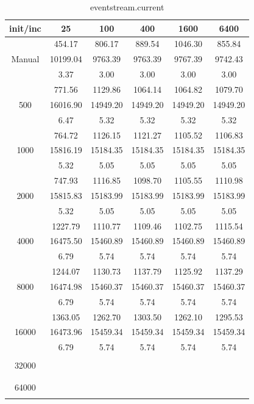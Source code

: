 {\begin{table}[th]
\centering
\begin{tabular}{|c||c|c|c|c|c|}
\hline
init/inc & 25 & 100 & 400 & 1600 & 6400 \\ \hline \hline
       & 454.17   & 806.17  & 889.54  & 1046.30 & 855.84 \\
Manual & 10199.04 & 9763.39 & 9763.39 & 9767.39 & 9742.43 \\
       & 3.37     & 3.00    & 3.00    & 3.00    & 3.00 \\ \hline
  & 771.56 & 1129.86 & 1064.14 & 1064.82 & 1079.70\\ 
500  & 16016.90 & 14949.20 & 14949.20 & 14949.20 & 14949.20\\ 
  & 6.47 & 5.32 & 5.32 & 5.32 & 5.32\\ \hline 
  & 764.72 & 1126.15 & 1121.27 & 1105.52 & 1106.83\\ 
1000  & 15816.19 & 15184.35 & 15184.35 & 15184.35 & 15184.35\\ 
  & 5.32 & 5.05 & 5.05 & 5.05 & 5.05\\ \hline 
  & 747.93 & 1116.85 & 1098.70 & 1105.55 & 1110.98\\ 
2000  & 15815.83 & 15183.99 & 15183.99 & 15183.99 & 15183.99\\ 
  & 5.32 & 5.05 & 5.05 & 5.05 & 5.05\\ \hline 
  & 1227.79 & 1110.77 & 1109.46 & 1102.75 & 1115.54\\ 
4000  & 16475.50 & 15460.89 & 15460.89 & 15460.89 & 15460.89\\ 
  & 6.79 & 5.74 & 5.74 & 5.74 & 5.74\\ \hline 
  & 1244.07 & 1130.73 & 1137.79 & 1125.92 & 1137.29\\ 
8000  & 16474.98 & 15460.37 & 15460.37 & 15460.37 & 15460.37\\ 
  & 6.79 & 5.74 & 5.74 & 5.74 & 5.74\\ \hline 
  & 1363.05 & 1262.70 & 1303.50 & 1262.10 & 1295.53\\ 
16000  & 16473.96 & 15459.34 & 15459.34 & 15459.34 & 15459.34\\ 
  & 6.79 & 5.74 & 5.74 & 5.74 & 5.74\\ \hline 
  &  &  &  &  & \\ 
32000  &  &  &  &  & \\ 
  &  &  &  &  & \\ \hline 
  &  &  &  &  & \\ 
64000  &  &  &  &  & \\ 
  &  &  &  &  & \\ \hline 
\end{tabular}
\caption{eventstream.current}
\label{tab:eventstream.current}
\end{table}

}
